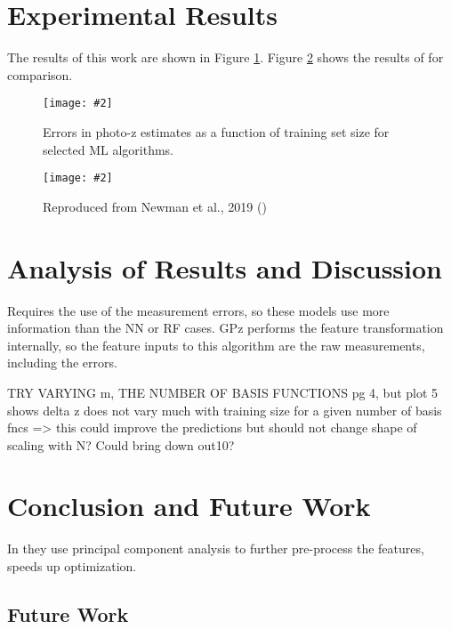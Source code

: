 \documentclass[13pt]{amsart}
\newcommand{\figscale}[4]{
\begin{figure}[h]
    \centering
    \caption{#3}
    \label{#4}
    \texttt{[image: \#2]}
\end{figure}
}
\begin{document}





\section{Experimental Results}

  The results of this work are shown in Figure \ref{fig:errs}. Figure \ref{fig:newman} shows the results of \cite{newman} for comparison.

  \figscale{1}{../data/errors_plots/errors.png}{Errors in photo-z estimates as a function of training set size for selected ML algorithms.}{fig:errs}

  \figscale{1}{../proposal/photozerrors.png}{Reproduced from Newman et al., 2019 (\cite{newman})}{fig:newman}




\section{Analysis of Results and Discussion}

  Requires the use of the measurement errors, so these models use more information than the NN or RF cases. GPz performs the feature transformation internally, so the feature inputs to this algorithm are the raw measurements, including the errors.

  TRY VARYING m, THE NUMBER OF BASIS FUNCTIONS \cite{sgp} pg 4, but plot 5 shows delta z does not vary much with training size for a given number of basis fncs => this could improve the predictions but should not change shape of scaling with N? Could bring down out10?




\section{Conclusion and Future Work}
  In \cite{gpz} they use principal component analysis to further pre-process the features, speeds up optimization.


  \subsection{Future Work}
\end{document}
